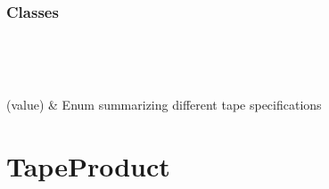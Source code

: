 \documentclass[letterpaper,10pt,english]{sphinxmanual}
\begin{document}
\subsubsection*{Classes}


\begin{savenotes}\sphinxatlongtablestart\begin{longtable}[c]{}
\hline

\endfirsthead

%
{}\\
\hline

\endhead

\hline
{}\\
\endfoot

\endlastfoot

\sphinxAtStartPar
{\hyperref[\detokenize{generated/quality_assessment.products.TapeProduct:quality_assessment.products.TapeProduct}]{}}(value)
&
\sphinxAtStartPar
Enum summarizing different tape specifications
\\
\hline
\end{longtable}\sphinxatlongtableend\end{savenotes}


\section{TapeProduct}
\label{\detokenize{generated/quality_assessment.products.TapeProduct:tapeproduct}}\label{\detokenize{generated/quality_assessment.products.TapeProduct::doc}}
\end{document}
